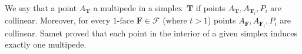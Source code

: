 \documentclass[12pt, reqno]{amsart}
\theoremstyle{definition}
\theoremstyle{remark}
\numberwithin{equation}{section}
\begin{document}
{We say that a point $A_\mathbf{T}$  a multipede in a simplex~$\mathbf{T}$ if points $A_\mathbf{T}, A_{\mathbf{T}_i}, P_i$ are collinear. Moreover, for every $1\mbox{-face}$ $\mathbf{F}\in\mathcal{F}$ (where $t> 1$) points $A_\mathbf{F}, A_{\mathbf{F}_i}, P_i$ are collinear. Samet proved that each point in the interior of a given simplex induces exactly one multipede. 






}
\end{document}
